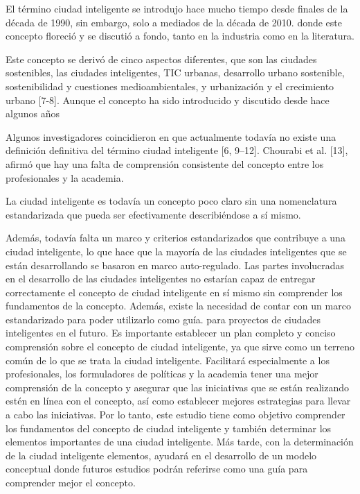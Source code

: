 \documentclass[a4paper,fleqn,spanish]{cas-dc}
\begin{document}

El término ciudad inteligente se introdujo hace mucho tiempo desde finales de
la década de 1990, sin embargo, solo a mediados de la década de 2010.
donde este concepto floreció y se discutió a fondo, tanto en la industria como en la
literatura.

Este concepto se derivó de cinco aspectos diferentes, que
son las ciudades sostenibles, las ciudades inteligentes, TIC urbanas,
desarrollo urbano sostenible, sostenibilidad y cuestiones medioambientales, y
urbanización y el crecimiento urbano [7-8]. Aunque el concepto ha sido
introducido y discutido desde hace algunos años

Algunos investigadores coincidieron en que actualmente todavía no existe
una definición definitiva del término ciudad inteligente [6, 9–12]. Chourabi et
al. [13], afirmó que hay una falta de comprensión consistente del concepto
entre los profesionales y la academia.

La ciudad inteligente es todavía un concepto poco claro sin una nomenclatura
estandarizada que pueda ser efectivamente describiéndose a sí mismo.

Además, todavía falta un marco y criterios estandarizados que contribuye a una ciudad
inteligente, lo que hace que la mayoría de las ciudades inteligentes que se
están desarrollando se basaron en marco auto-regulado. Las partes involucradas
en el desarrollo de las ciudades inteligentes no estarían capaz de entregar
correctamente el concepto de ciudad inteligente en sí mismo sin comprender los
fundamentos de la concepto. Además, existe la necesidad de contar con un marco
estandarizado para poder utilizarlo como guía. para proyectos de ciudades
inteligentes en el futuro.
Es importante establecer un plan completo y conciso comprensión sobre el
concepto de ciudad inteligente, ya que sirve como un terreno común de lo que se
trata la ciudad inteligente.
Facilitará especialmente a los profesionales, los formuladores de políticas y
la academia tener una mejor comprensión de la concepto y asegurar que las
iniciativas que se están realizando estén en línea con el concepto, así como
establecer mejores estrategias para llevar a cabo las iniciativas. Por lo
tanto, este estudio tiene como objetivo comprender los fundamentos del concepto
de ciudad inteligente y también determinar los elementos importantes de una
ciudad inteligente. Más tarde, con la determinación de la ciudad inteligente
elementos, ayudará en el desarrollo de un modelo conceptual donde futuros
estudios podrán referirse como una guía para comprender mejor el concepto.
\end{document}

